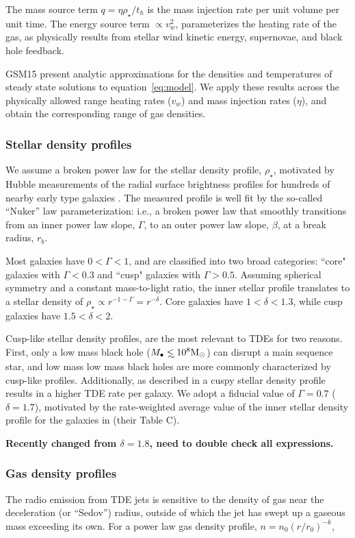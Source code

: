 \documentclass[usenatbib,fleqn]{mnras}
\newcommand\lsim{\mathrel{\rlap{\lower4pt\hbox{\hskip1pt$\sim$}}
    \raise1pt\hbox{$<$}}}
\newcommand{\Mbh}[1][]{M_{\bullet#1}}
\renewcommand{\th}{t_h}
\newcommand{\Msun}{{\rm M_\odot}}
\begin{document}
The mass source term $q =\eta \rho_\star/\th$ is the mass injection
rate per unit volume per unit time. The energy source term $\propto
v_w^{2}$, parameterizes the heating rate of the gas, as physically
results from stellar wind kinetic energy, supernovae, and black hole
feedback.

GSM15 present analytic approximations for the
densities and temperatures of steady state solutions to
equation~\eqref{eq:model}. We apply these results across the
physically allowed range heating rates ($v_w$) and mass injection
rates ($\eta$), and obtain the corresponding range of gas densities.

\subsubsection{Stellar density profiles}
We assume a broken power law for the stellar density profile,
$\rho_{\star}$, motivated by Hubble measurements of the radial surface
brightness profiles for hundreds of nearby early type galaxies
\citep{Lauer+2007}.  The measured profile is well fit by the so-called
``Nuker'' law parameterization: i.e., a broken power law that smoothly
transitions from an inner power law slope, $\Gamma$, to an outer power
law slope, $\beta$, at a break radius, $r_b$.

Most galaxies have $0<\Gamma<1$, and are classified into two broad
categories: ``core" galaxies with $\Gamma<0.3$ and ``cusp" galaxies with
$\Gamma>0.5$. Assuming spherical symmetry and a constant mass-to-light
ratio, the inner stellar profile translates to a stellar density of
$\rho_\star\propto r^{-1-\Gamma}=r^{-\delta}$. Core galaxies have
$1<\delta<1.3$, while cusp galaxies have $1.5<\delta<2$.

Cusp-like stellar density profiles, are the most relevant to TDEs for
two reasons.  First, only a low mass black hole ($\Mbh\lsim 10^8
\Msun$) can disrupt a main sequence star, and low mass low mass black
holes are more commonly characterized by cusp-like profiles.
Additionally, as described in \citet{Stone&Metzger2016} a cuspy
stellar density profile results in a higher TDE rate per galaxy.  We
adopt a fiducial value of $\Gamma=0.7$ ($\delta=1.7$), motivated by
the rate-weighted average value of the inner stellar density profile for
the galaxies in \citet{Stone&Metzger2016} (their Table C).


 {\bf Recently changed from $\delta=1.8$, need to
  double check all expressions.}

\subsubsection{Gas density profiles}
The radio emission from TDE jets is sensitive to the density of gas
near the deceleration (or ``Sedov'') radius, outside of which the jet
has swept up a gaseous mass exceeding its own. For a power law gas
density profile, $n= n_0 \left(r/r_0\right)^{-k}$,
\end{document}
